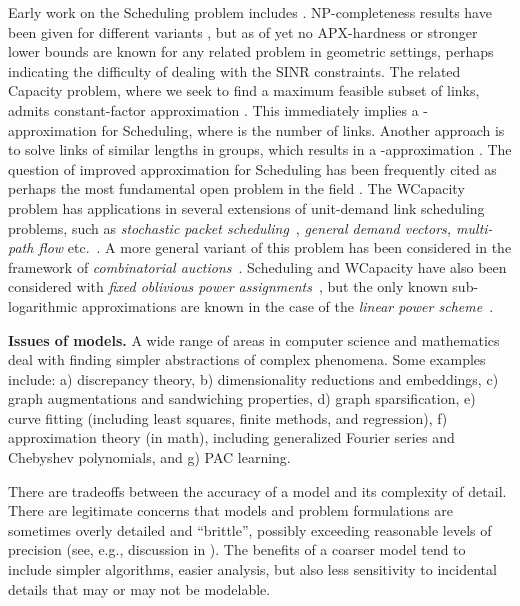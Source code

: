 \documentclass[11pt]{article}
\newcommand{\mypara}[1]{\smallskip\noindent\textbf{#1.}}  \newcommand{\tightpara}[1]{\noindent\textbf{#1.}}
\newcommand{\capacity}{\textsf{Capacity}}
\newcommand{\wcapacity}{\textsf{WCapacity}}
\newcommand{\scheduling}{\textsf{Scheduling}}
\begin{document}
Early work on the {\scheduling} problem includes \cite{CruzS03,elbatt02,chafekar07,goussevskaiacomplexity}.
NP-completeness results have been given for different variants \cite{goussevskaiacomplexity, katz2010energy,lin2012complexity}, but as of yet no APX-hardness or stronger lower bounds are known for any related problem in geometric settings, perhaps indicating the difficulty of dealing with the SINR constraints.
The related {\capacity} problem, where we seek to find a maximum feasible subset of links, admits constant-factor
approximation \cite{kesselheimconstantfactor}.  This immediately implies a -approximation for {\scheduling},
where  is the number of links.  Another approach is to solve links of similar lengths in groups, which results in a
-approximation \cite{goussevskaiacomplexity,fu2009power,us:talg12}.  The question of improved
approximation for {\scheduling} has been frequently cited as perhaps the most fundamental open problem in the field
\cite{locher2008sensor,dagstuhl11091,fanghanel2011scheduling,GoussevskaiaHW14,halldorsson2014making}. 
The {\wcapacity} problem has applications in several extensions of unit-demand link scheduling problems, such as \emph{stochastic packet scheduling}~\cite{TE92,ryu2013dss,kesselheimStability}, \emph{general demand vectors, multi-path flow} etc.~\cite{WanFJYXT11}. A more general variant of this problem has been considered in the framework of \emph{combinatorial auctions}~\cite{HoeferKV11, HoeferK12}.
{\scheduling} and {\wcapacity} have also been considered with \emph{fixed oblivious power assignments}~\cite{halwatapx, fangkesoblivious, us:talg12,
  halmitcognitive,fangkeslinear}, but the only known sub-logarithmic approximations are known in the case of the
\emph{linear power scheme}~\cite{halmitcognitive, tonoyanlinear}.

\mypara{Issues of models}
A wide range of areas in computer science and mathematics deal with finding simpler abstractions of complex
phenomena. Some examples include: a) discrepancy theory, b) dimensionality reductions and embeddings, c) graph
augmentations and sandwiching properties, d) graph sparsification, e) curve fitting (including least squares, finite
methods, and regression), f) approximation theory (in math), including generalized Fourier series and Chebyshev
polynomials, and g) PAC learning.

There are tradeoffs between the accuracy of a model and its complexity of detail.
There are legitimate concerns that models and problem formulations are sometimes overly detailed and ``brittle'',
possibly exceeding reasonable levels of precision (see, e.g., discussion in \cite{papadimitriou1997np}).
The benefits of a coarser model tend to include simpler algorithms, easier analysis, but also less sensitivity to incidental details that may or may not be modelable.
\end{document}
